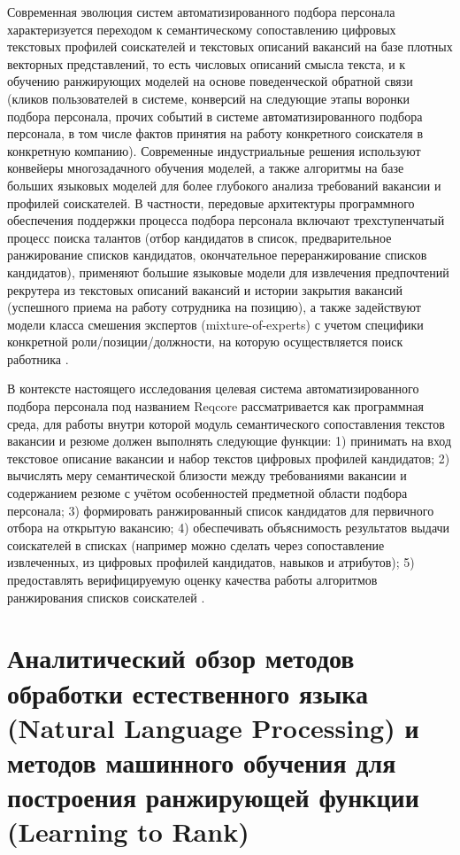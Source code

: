 Современная эволюция систем автоматизированного подбора персонала характеризуется переходом к семантическому сопоставлению цифровых текстовых профилей соискателей и текстовых описаний вакансий на базе плотных векторных представлений, то есть числовых описаний смысла текста, и к обучению ранжирующих моделей на основе поведенческой обратной связи (кликов пользователей в системе, конверсий на следующие этапы воронки подбора персонала, прочих событий в системе автоматизированного подбора персонала, в том числе фактов принятия на работу конкретного соискателя в конкретную компанию). Современные индустриальные решения используют конвейеры многозадачного обучения моделей, а также алгоритмы на базе больших языковых моделей для более глубокого анализа требований вакансии и профилей соискателей. В частности, передовые архитектуры программного обеспечения поддержки процесса подбора персонала включают трехступенчатый процесс поиска талантов (отбор кандидатов в список, предварительное ранжирование списков кандидатов, окончательное переранжирование списков кандидатов), применяют большие языковые модели для извлечения предпочтений рекрутера из текстовых описаний вакансий и истории закрытия вакансий (успешного приема на работу сотрудника на позицию), а также задействуют модели класса смешения экспертов (mixture-of-experts) с учетом специфики конкретной роли/позиции/должности, на которую осуществляется поиск работника \cite{src17}.

В контексте настоящего исследования целевая система автоматизированного подбора персонала под названием Reqcore рассматривается как программная среда, для работы внутри которой модуль семантического сопоставления текстов вакансии и резюме должен выполнять следующие функции: 1) принимать на вход текстовое описание вакансии и набор текстов цифровых профилей кандидатов; 2) вычислять меру семантической близости между требованиями вакансии и содержанием резюме с учётом особенностей предметной области подбора персонала; 3) формировать ранжированный список кандидатов для первичного отбора на открытую вакансию; 4) обеспечивать объяснимость результатов выдачи соискателей в списках (например можно сделать через сопоставление извлеченных, из цифровых профилей кандидатов, навыков и атрибутов); 5) предоставлять верифицируемую оценку качества работы алгоритмов ранжирования списков соискателей \cite{src02, src23}.

\section{Аналитический обзор методов обработки естественного языка (Natural Language Processing) и методов машинного обучения для построения ранжирующей функции (Learning to Rank)}

